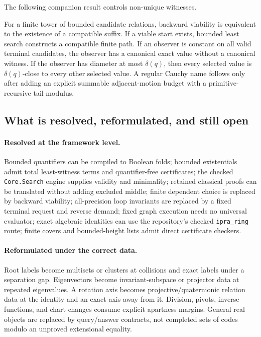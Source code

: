 The following companion result controls non-unique witnesses.

\begin{theorem}\label{thm:relational-summary}
For a finite tower of bounded candidate relations, backward viability is equivalent to the existence of a compatible suffix.  If a viable start exists, bounded least search constructs a compatible finite path.  If an observer is constant on all valid terminal candidates, the observer has a canonical exact value without a canonical witness.  If the observer has diameter at most \(\delta(q)\), then every selected value is \(\delta(q)\)-close to every other selected value.  A regular Cauchy name follows only after adding an explicit summable adjacent-motion budget with a primitive-recursive tail modulus.
\end{theorem}

\subsection{What is resolved, reformulated, and still open}

\paragraph{Resolved at the framework level.}
Bounded quantifiers can be compiled to Boolean folds; bounded existentials admit total least-witness terms and quantifier-free certificates; the checked \texttt{Core.Search} engine supplies validity and minimality; retained classical proofs can be translated without adding excluded middle; finite dependent choice is replaced by backward viability; all-precision loop invariants are replaced by a fixed terminal request and reverse demand; fixed graph execution needs no universal evaluator; exact algebraic identities can use the repository's checked \texttt{ipra\_ring} route; finite covers and bounded-height lists admit direct certificate checkers.

\paragraph{Reformulated under the correct data.}
Root labels become multisets or clusters at collisions and exact labels under a separation gap.  Eigenvectors become invariant-subspace or projector data at repeated eigenvalues.  A rotation axis becomes projective/quaternionic relation data at the identity and an exact axis away from it.  Division, pivots, inverse functions, and chart changes consume explicit apartness margins.  General real objects are replaced by query/answer contracts, not completed sets of codes modulo an unproved extensional equality.

